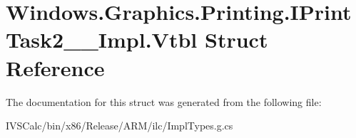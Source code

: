 \hypertarget{struct_windows_1_1_graphics_1_1_printing_1_1_i_print_task2_____impl_1_1_vtbl}{}\section{Windows.\+Graphics.\+Printing.\+I\+Print\+Task2\+\_\+\+\_\+\+Impl.\+Vtbl Struct Reference}
\label{struct_windows_1_1_graphics_1_1_printing_1_1_i_print_task2_____impl_1_1_vtbl}


The documentation for this struct was generated from the following file\+:\begin{DoxyCompactItemize}
\item 
I\+V\+S\+Calc/bin/x86/\+Release/\+A\+R\+M/ilc/Impl\+Types.\+g.\+cs\end{DoxyCompactItemize}
